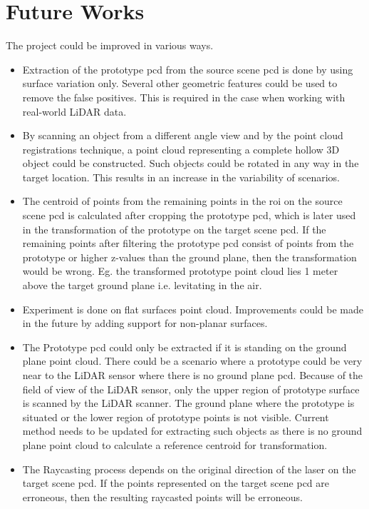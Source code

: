 \section{Future Works}
The project could be improved in various ways.
\begin{itemize}
    \item Extraction of the prototype \acrshort{pcd} from the source scene \acrshort{pcd} is done by using surface variation only. Several other geometric features could be used to remove the false positives. This is required in the case when working with real-world LiDAR data.
    \item By scanning an object from a different angle view and by the point cloud registrations technique, a point cloud representing a complete hollow 3D object could be constructed. Such objects could be rotated in any way in the target location. This results in an increase in the variability of scenarios.
    \item The centroid of points from the remaining points in the \acrshort{roi} on the source scene \acrshort{pcd} is calculated after cropping the prototype \acrshort{pcd}, which is later used in the transformation of the prototype on the target scene \acrshort{pcd}. If the remaining points after filtering the prototype \acrshort{pcd} consist of points from the prototype or higher z-values than the ground plane, then the transformation would be wrong. Eg. the transformed prototype point cloud lies 1 meter above the target ground plane i.e. levitating in the air.
    \item Experiment is done on flat surfaces point cloud. Improvements could be made in the future by adding support for non-planar surfaces.
    \item The Prototype \acrshort{pcd} could only be extracted if it is standing on the ground plane point cloud. There could be a scenario where a prototype could be very near to the LiDAR sensor where there is no ground plane \acrshort{pcd}. Because of the field of view of the LiDAR sensor, only the upper region of prototype surface is scanned by the LiDAR scanner. The ground plane where the prototype is situated or the lower region of prototype points is not visible. Current method needs to be updated for extracting such objects as there is no ground plane point cloud to calculate a reference centroid for transformation.
    \item The Raycasting process depends on the original direction of the laser on the target scene \acrshort{pcd}. If the points represented on the target scene \acrshort{pcd} are erroneous, then the resulting raycasted points will be erroneous.

\end{itemize}

